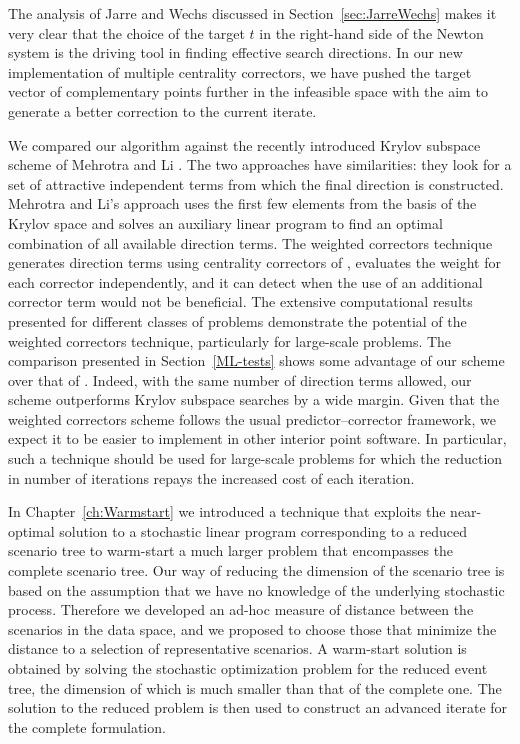 The analysis of Jarre and Wechs \cite{JarreWechs}
discussed in Section~\ref{sec:JarreWechs}
makes it very clear that the choice of the target $t$ in
the right-hand side of the Newton system is the driving
tool in finding effective search directions.
In our new implementation of multiple centrality correctors, we
have pushed the target vector of complementary points further
in the infeasible space with the aim to generate a better
correction to the current iterate.

We compared our algorithm against the recently introduced 
Krylov subspace scheme of Mehrotra and Li \cite{MehrotraLi}.
The two approaches have similarities: they look for a set of attractive 
independent terms from which the final direction is constructed. 
Mehrotra and Li's approach uses the first few elements from the basis
of the Krylov space and solves an auxiliary linear program to find an
optimal combination of all available direction terms.
The weighted correctors technique generates direction terms using 
centrality correctors of \cite{Gondzio96}, evaluates the weight
for each corrector independently, and it can detect when the use
of an additional corrector term would not be beneficial.
The extensive computational results presented for different 
classes of problems demonstrate the potential of the
weighted correctors technique, particularly for large-scale problems.
The comparison presented in Section~\ref{ML-tests} 
shows some advantage
of our scheme over that of \cite{MehrotraLi}. Indeed, with the same 
number of direction terms allowed, our scheme outperforms Krylov subspace 
searches by a wide margin.
Given that the weighted correctors scheme follows the usual 
predictor--corrector framework,
we expect it to be easier to implement in other interior point software.
In particular, such a technique should be used for large-scale problems
for which the reduction in number of iterations repays the
increased cost of each iteration. 

In Chapter~\ref{ch:Warmstart}
we introduced a technique that exploits the near-optimal solution
to a stochastic linear program corresponding to a 
reduced scenario tree to warm-start a much larger problem 
that encompasses the complete scenario tree.
Our way of reducing the dimension of the scenario tree 
is based on the assumption that we have no knowledge 
of the underlying stochastic process. 
Therefore we developed an ad-hoc measure of distance 
between the scenarios in the data space, and we proposed to choose
those that minimize the distance to 
a selection of representative scenarios. 
A warm-start solution is obtained by solving the 
stochastic optimization problem for the reduced event tree, the dimension 
of which is much smaller than that of the complete one. The solution 
to the reduced problem is then used to construct an advanced iterate for 
the complete formulation. 

